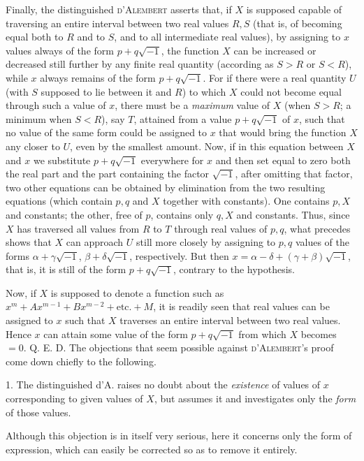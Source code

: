 Finally, the distinguished \textsc{d'Alembert} asserts that, if $X$ is supposed capable of traversing an entire interval between two real values $R,S$ (that is, of becoming equal both to $R$ and to $S$, and to all intermediate real values), by assigning to $x$ values always of the form $p+q\sqrt{-1}$, the function $X$ can be increased or decreased still further by any finite real quantity (according as $S>R$ or $S<R$), while $x$ always remains of the form $p+q\sqrt{-1}$. For if there were a real quantity $U$ (with $S$ supposed to lie between it and $R$) to which $X$ could not become equal through such a value of $x$, there must be a \textit{maximum} value of $X$ (when $S>R$; a minimum when $S<R$), say $T$, attained from a value $p+q\sqrt{-1}$ of $x$, such that no value of the same form could be assigned to $x$ that would bring the function $X$ any closer to $U$, even by the smallest amount. Now, if in this equation between $X$ and $x$ we substitute $p+q\sqrt{-1}$ everywhere for $x$ and then set equal to zero both the real part and the part containing the factor $\sqrt{-1}$, after omitting that factor, two other equations can be obtained by elimination from the two resulting equations (which contain $p,q$ and $X$ together with constants). One contains $p,X$ and constants; the other, free of $p$, contains only $q,X$ and constants. Thus, since $X$ has traversed all values from $R$ to $T$ through real values of $p,q$, what precedes shows that $X$ can approach $U$ still more closely by assigning to $p,q$ values of the forms $\alpha+\gamma\sqrt{-1}$, $\beta+\delta\sqrt{-1}$, respectively. But then $x=\alpha-\delta+(\gamma+\beta)\sqrt{-1}$, that is, it is still of the form $p+q\sqrt{-1}$, contrary to the hypothesis.

Now, if $X$ is supposed to denote a function such as $x^m+Ax^{m-1}+Bx^{m-2}+\text{etc.}+M$, it is readily seen that real values can be assigned to $x$ such that $X$ traverses an entire interval between two real values. Hence $x$ can attain some value of the form $p+q\sqrt{-1}$ from which $X$ becomes $=0$. Q. E. D.
The objections that seem possible against \textsc{d'Alembert}'s proof come down chiefly to the following.

1. The distinguished d'A. raises no doubt about the \textit{existence} of values of $x$ corresponding to given values of $X$, but assumes it and investigates only the \textit{form} of those values.

Although this objection is in itself very serious, here it concerns only the form of expression, which can easily be corrected so as to remove it entirely.

